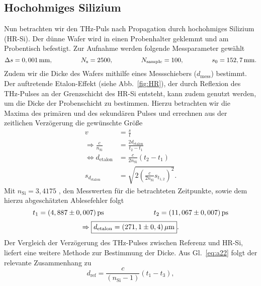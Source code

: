 \subsection{\label{sec:A22}Hochohmiges Silizium}
Nun betrachten wir den THz-Puls nach Propagation durch hochohmiges Silizium (HR-Si).
Der dünne Wafer wird in einen Probenhalter geklemmt und am Probentisch befestigt. Zur Aufnahme 
werden folgende Messparameter gewählt
\begin{equation}
    \Delta s = 0,001\,\si{mm}, \hspace{1.5cm} N_{\text{s}} = 2500, \hspace{1.5cm} N_{\text{sample}} = 100, \hspace{1.5cm} s_{0} = 152,7\,\si{mm}.
\end{equation}
Zudem wir die Dicke des Wafers mithilfe eines Messschiebers ($d_{\text{mess}}$) bestimmt. 
Der auftretende Etalon-Effekt (siehe Abb.~\ref{fig:HR}), der durch Reflexion des THz-Pulses 
an der Grenzschicht des HR-Si 
entsteht, kann zudem genutzt werden, um die Dicke der Probenschicht zu bestimmen. 
Hierzu betrachten wir die Maxima des primären und des sekundären Pulses und errechnen aus 
der zeitlichen Verzögerung die gewünschte Größe
\begin{align}
    v &= \frac{s}{t} \\
    \Rightarrow \frac{c}{n_{\text{Si}}} &= \frac{2d_{\text{etalon}}}{t_{2} - t_{1}} \\
    \Leftrightarrow d_{\text{etalon}} &= \frac{c}{2n_{\text{Si}}}\left(t_{2} - t_{1}\right) \\
    s_{d_{\text{etalon}}} &= \sqrt{2\left(\frac{c}{2n_{\text{Si}}}s_{t_{1,2}}\right)^{2}}.
\end{align} 
Mit $n_{\text{Si}} = 3,4175$ \cite{Anleitung}, den Messwerten für die betrachteten Zeitpunkte, 
sowie dem hierzu abgeschätzten Ablesefehler folgt 
\begin{equation}
    t_{1} = (4,887 \pm 0,007)\,\si{ps} \hspace{2.5cm} t_{2} = (11,067 \pm 0,007)\,\si{ps}
\end{equation}
\begin{equation}
    \Rightarrow\fbox{$d_{\text{etalon}} = (271,1 \pm 0,4)\,\si{\mu m}$}.
\end{equation}
Der Vergleich der Verzögerung des THz-Pulses zwischen Referenz und HR-Si, liefert eine 
weitere Methode zur Bestimmung der Dicke. Aus Gl.~\eqref{eq:a22} folgt der relevante Zusammenhang zu
\begin{equation}
    d_{\text{ref}} = \frac{c}{(n_{\text{Si}} - 1)}\left(t_{1} - t_{3}\right),
\end{equation}
